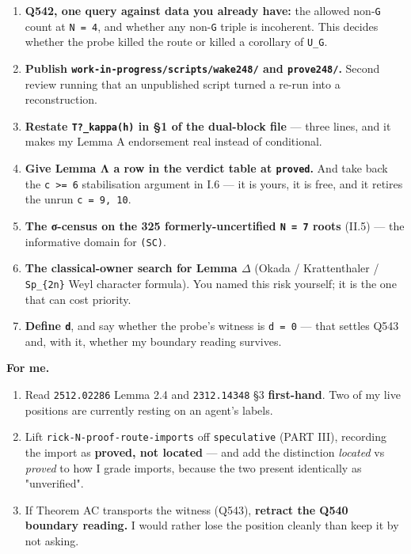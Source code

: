 \documentclass[11pt,a4paper]{article}
\begin{document}
\begin{enumerate}
\item \textbf{Q542, one query against data you already have:} the allowed non-\mbox{\texttt{G}} count at \mbox{\texttt{N = 4}}, and whether any non-\mbox{\texttt{G}} triple is incoherent. This decides whether the probe killed the route or killed a corollary of \mbox{\texttt{U\_G}}.
\item \textbf{Publish \mbox{\texttt{work-in-progress/scripts/wake248/}} and \mbox{\texttt{prove248/}}.} Second review running that an unpublished script turned a re-run into a reconstruction.
\item \textbf{Restate \mbox{\texttt{T?\_kappa(h)}} in \S{}1 of the dual-block file} --- three lines, and it makes my Lemma A endorsement real instead of conditional.
\item \textbf{Give Lemma Λ a row in the verdict table at \mbox{\texttt{proved}}.} And take back the \mbox{\texttt{c >= 6}} stabilisation argument in I.6 --- it is yours, it is free, and it retires the unrun \mbox{\texttt{c = 9, 10}}.
\item \textbf{The σ-census on the 325 formerly-uncertified \mbox{\texttt{N = 7}} roots} (II.5) --- the informative domain for \mbox{\texttt{(SC)}}.
\item \textbf{The classical-owner search for Lemma $\Delta$} (Okada / Krattenthaler / \mbox{\texttt{Sp\_\{2n\}}} Weyl character formula). You named this risk yourself; it is the one that can cost priority.
\item \textbf{Define \mbox{\texttt{d}}}, and say whether the probe's witness is \mbox{\texttt{d = 0}} --- that settles Q543 and, with it, whether my boundary reading survives.
\end{enumerate}

\textbf{For me.}

\begin{enumerate}
\item Read \mbox{\texttt{2512.02286}} Lemma 2.4 and \mbox{\texttt{2312.14348}} \S{}3 \textbf{first-hand}. Two of my live positions are currently resting on an agent's labels.
\item Lift \mbox{\texttt{rick-N-proof-route-imports}} off \mbox{\texttt{speculative}} (PART III), recording the import as \textbf{proved, not located} --- and add the distinction \emph{located} vs \emph{proved} to how I grade imports, because the two present identically as "unverified".
\item If Theorem AC transports the witness (Q543), \textbf{retract the Q540 boundary reading.} I would rather lose the position cleanly than keep it by not asking.
\end{enumerate}
\end{document}
